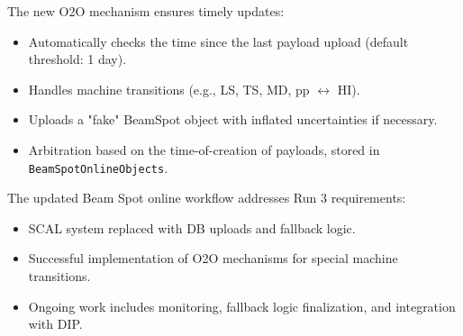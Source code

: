 The new O2O mechanism ensures timely updates:
\begin{itemize}
    \item Automatically checks the time since the last payload upload (default threshold: 1 day).
    \item Handles machine transitions (e.g., LS, TS, MD, pp $\leftrightarrow$ HI).
    \item Uploads a "fake" BeamSpot object with inflated uncertainties if necessary.
    \item Arbitration based on the time-of-creation of payloads, stored in \texttt{BeamSpotOnlineObjects}.
\end{itemize}

The updated Beam Spot online workflow addresses Run 3 requirements:
\begin{itemize}
    \item SCAL system replaced with DB uploads and fallback logic.
    \item Successful implementation of O2O mechanisms for special machine transitions.
    \item Ongoing work includes monitoring, fallback logic finalization, and integration with DIP.
\end{itemize}


